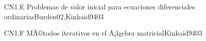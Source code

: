 \begin{syllabus}
\begin{unit}{CN1.E Problemas de valor inicial para ecuaciones diferenciales ordinarias}{Burden02,Kinkaid94}{0}{3}
   \begin{unitgoals}
      \item \CNONEObjONE
      \item \CNONEObjTWO
      \item \CNONEObjTHREE
      \item \CNONEObjFOUR
   \end{unitgoals}
\end{unit}

\begin{unit}{CN1.F MÃ©todos iterativos en el Ã¡lgebra matricial}{Kinkaid94}{0}{3}
\begin{topics}
      \item \CNONETopicLinear
      \item \CNONETopicFinite
   \end{topics}

   \begin{unitgoals}
      \item \CNONEObjONE
      \item \CNONEObjTWO
      \item \CNONEObjTHREE
      \item \CNONEObjFOUR
   \end{unitgoals}
\end{unit}



\begin{coursebibliography}
\end{coursebibliography}

\end{syllabus}

